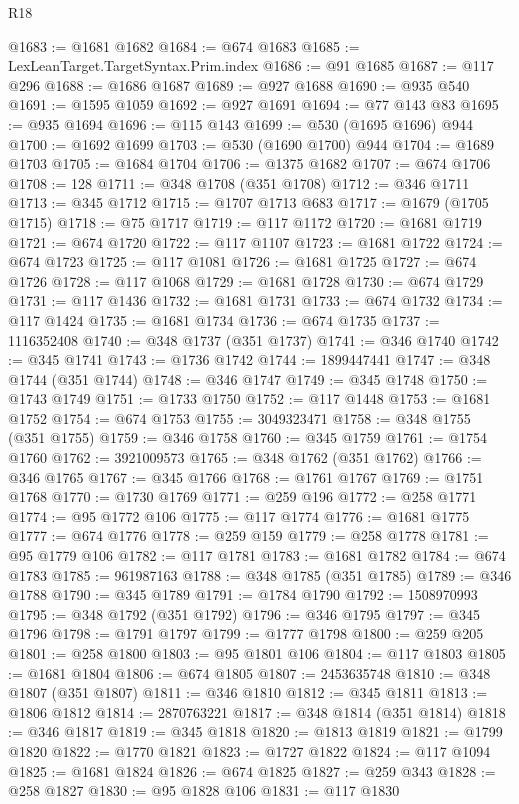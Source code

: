 \begin{lexlean}{R18}
\begin{coremodule}
@1683 := @1681 @1682
@1684 := @674 @1683
@1685 := LexLeanTarget.TargetSyntax.Prim.index
@1686 := @91 @1685
@1687 := @117 @296
@1688 := @1686 @1687
@1689 := @927 @1688
@1690 := @935 @540
@1691 := @1595 @1059
@1692 := @927 @1691
@1694 := @77 @143 @83
@1695 := @935 @1694
@1696 := @115 @143
@1699 := @530 (@1695 @1696) @944
@1700 := @1692 @1699
@1703 := @530 (@1690 @1700) @944
@1704 := @1689 @1703
@1705 := @1684 @1704
@1706 := @1375 @1682
@1707 := @674 @1706
@1708 := 128
@1711 := @348 @1708 (@351 @1708)
@1712 := @346 @1711
@1713 := @345 @1712
@1715 := @1707 @1713 @683
@1717 := @1679 (@1705 @1715)
@1718 := @75 @1717
@1719 := @117 @1172
@1720 := @1681 @1719
@1721 := @674 @1720
@1722 := @117 @1107
@1723 := @1681 @1722
@1724 := @674 @1723
@1725 := @117 @1081
@1726 := @1681 @1725
@1727 := @674 @1726
@1728 := @117 @1068
@1729 := @1681 @1728
@1730 := @674 @1729
@1731 := @117 @1436
@1732 := @1681 @1731
@1733 := @674 @1732
@1734 := @117 @1424
@1735 := @1681 @1734
@1736 := @674 @1735
@1737 := 1116352408
@1740 := @348 @1737 (@351 @1737)
@1741 := @346 @1740
@1742 := @345 @1741
@1743 := @1736 @1742
@1744 := 1899447441
@1747 := @348 @1744 (@351 @1744)
@1748 := @346 @1747
@1749 := @345 @1748
@1750 := @1743 @1749
@1751 := @1733 @1750
@1752 := @117 @1448
@1753 := @1681 @1752
@1754 := @674 @1753
@1755 := 3049323471
@1758 := @348 @1755 (@351 @1755)
@1759 := @346 @1758
@1760 := @345 @1759
@1761 := @1754 @1760
@1762 := 3921009573
@1765 := @348 @1762 (@351 @1762)
@1766 := @346 @1765
@1767 := @345 @1766
@1768 := @1761 @1767
@1769 := @1751 @1768
@1770 := @1730 @1769
@1771 := @259 @196
@1772 := @258 @1771
@1774 := @95 @1772 @106
@1775 := @117 @1774
@1776 := @1681 @1775
@1777 := @674 @1776
@1778 := @259 @159
@1779 := @258 @1778
@1781 := @95 @1779 @106
@1782 := @117 @1781
@1783 := @1681 @1782
@1784 := @674 @1783
@1785 := 961987163
@1788 := @348 @1785 (@351 @1785)
@1789 := @346 @1788
@1790 := @345 @1789
@1791 := @1784 @1790
@1792 := 1508970993
@1795 := @348 @1792 (@351 @1792)
@1796 := @346 @1795
@1797 := @345 @1796
@1798 := @1791 @1797
@1799 := @1777 @1798
@1800 := @259 @205
@1801 := @258 @1800
@1803 := @95 @1801 @106
@1804 := @117 @1803
@1805 := @1681 @1804
@1806 := @674 @1805
@1807 := 2453635748
@1810 := @348 @1807 (@351 @1807)
@1811 := @346 @1810
@1812 := @345 @1811
@1813 := @1806 @1812
@1814 := 2870763221
@1817 := @348 @1814 (@351 @1814)
@1818 := @346 @1817
@1819 := @345 @1818
@1820 := @1813 @1819
@1821 := @1799 @1820
@1822 := @1770 @1821
@1823 := @1727 @1822
@1824 := @117 @1094
@1825 := @1681 @1824
@1826 := @674 @1825
@1827 := @259 @343
@1828 := @258 @1827
@1830 := @95 @1828 @106
@1831 := @117 @1830

\end{coremodule}
\end{lexlean}
